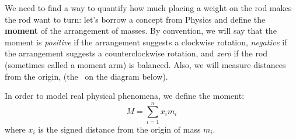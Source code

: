 
We need to find a way to quantify how much placing a weight on the rod makes the rod want to turn: let's borrow a concept from Physics and define the \textbf{moment} of the arrangement of masses. By convention, we will say that the moment is \textit{positive} if the arrangement suggests a clockwise rotation, \textit{negative} if the arrangement suggests a counterclockwise rotation, and \textit{zero} if the rod (sometimes called a moment arm) is balanced. Also, we will measure distances from the origin, (the \textbullet \ on the diagram below).

In order to model real physical phenomena, we define the moment:
$$
M=\sum_{i=1}^nx_im_i
$$
where $x_i$ is the signed distance from the origin of mass $m_i$.

